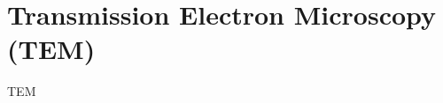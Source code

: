 \documentclass[\main/dresen_thesis.tex]{subfiles}
\begin{document}
  \section{Transmission Electron Microscopy (TEM)}
    \label{ch:methods:tem}
    TEM
\end{document}
